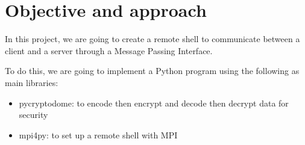 \section{Objective and approach}

In this project, we are going to create a remote shell to communicate between a client and a server through a Message Passing Interface.

To do this, we are going to implement a Python program using the following as main libraries:

\begin{itemize}
    \item pycryptodome: to encode then encrypt and decode then decrypt data for security
    \item mpi4py: to set up a remote shell with MPI
\end{itemize}
